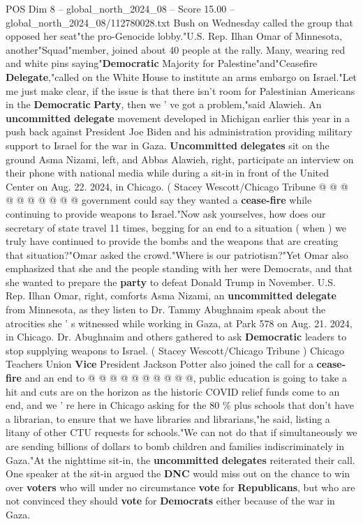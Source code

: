 \begin{textsample}{POS Dim 8 – global\_north\_2024\_08 – Score 15.00 – global\_north\_2024\_08/112780028.txt}
Bush on Wednesday called the group that opposed her seat"the pro-Genocide lobby."U.S.
Rep.
Ilhan Omar of Minnesota, another"Squad"member, joined about 40 people at the rally.
Many, wearing red and white pins saying"\textbf{Democratic} Majority for Palestine"and"Ceasefire \textbf{Delegate},"called on the White House to institute an arms embargo on Israel."Let me just make clear, if the issue is that there isn't room for Palestinian Americans in the \textbf{Democratic} \textbf{Party}, then we ' ve got a problem,"said Alawieh.
An \textbf{uncommitted} \textbf{delegate} movement developed in Michigan earlier this year in a push back against President Joe Biden and his administration providing military support to Israel for the war in Gaza. \textbf{Uncommitted} \textbf{delegates} sit on the ground Asma Nizami, left, and Abbas Alawieh, right, participate an interview on their phone with national media while during a sit-in in front of the United Center on Aug. 22. 2024, in Chicago. ( Stacey Wescott/Chicago Tribune @ @ @ @ @ @ @ @ @ @ government could say they wanted a \textbf{cease-fire} while continuing to provide weapons to Israel."Now ask yourselves, how does our secretary of state travel 11 times, begging for an end to a situation ( when ) we truly have continued to provide the bombs and the weapons that are creating that situation?"Omar asked the crowd."Where is our patriotism?"Yet Omar also emphasized that she and the people standing with her were Democrats, and that she wanted to prepare the \textbf{party} to defeat Donald Trump in November.
U.S.
Rep.
Ilhan Omar, right, comforts Asma Nizami, an \textbf{uncommitted} \textbf{delegate} from Minnesota, as they listen to Dr.
Tammy Abughnaim speak about the atrocities she ' s witnessed while working in Gaza, at Park 578 on Aug. 21. 2024, in Chicago.
Dr.
Abughnaim and others gathered to ask \textbf{Democratic} leaders to stop supplying weapons to Israel. ( Stacey Wescott/Chicago Tribune ) Chicago Teachers Union \textbf{Vice} President Jackson Potter also joined the call for a \textbf{cease-fire} and an end to @ @ @ @ @ @ @ @ @ @, public education is going to take a hit and cuts are on the horizon as the historic COVID relief funds come to an end, and we ' re here in Chicago asking for the 80 \% plus schools that don't have a librarian, to ensure that we have libraries and librarians,"he said, listing a litany of other CTU requests for schools."We can not do that if simultaneously we are sending billions of dollars to bomb children and families indiscriminately in Gaza."At the nighttime sit-in, the \textbf{uncommitted} \textbf{delegates} reiterated their call.
One speaker at the sit-in argued the \textbf{DNC} would miss out on the chance to win over \textbf{voters} who will under no circumstance \textbf{vote} for \textbf{Republicans}, but who are not convinced they should \textbf{vote} for \textbf{Democrats} either because of the war in Gaza.

\end{textsample}
